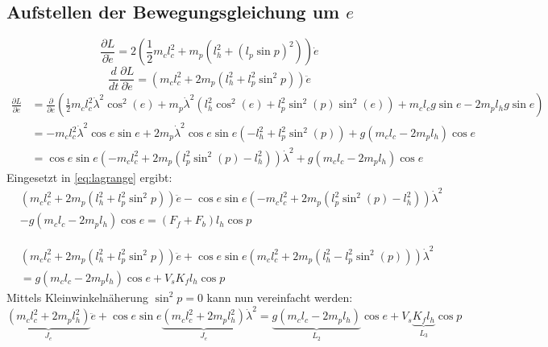 \documentclass{article}
\begin{document}
\subsection{Aufstellen der Bewegungsgleichung um $e$}
\begin{equation}
\frac{\partial L}{\partial \dot{e}} = 2(\frac{1}{2}m_cl_c^2
+ m_p(l_h^2+(l_p\sin p)^2))\dot{e}
\end{equation}
\begin{equation}
\frac{d}{dt}\frac{\partial L}{\partial \dot{e}} = (m_cl_c^2
+ 2 m_p(l_h^2+l_p^2\sin^2 p))\ddot{e}
\end{equation}
\begin{equation}
\begin{split}
\frac{\partial L}{\partial e} &= \frac{\partial}{\partial e}(\frac{1}{2} m_c l_c^2 \dot{\lambda}^2 \cos^2 (e) + m_p \dot{\lambda}^2 (l_h^2 \cos^2 (e) + l_p^2 \sin^2 (p) \sin^2 (e))
+ m_c l_c g \sin e - 2 m_p l_h g \sin e)\\
&= -m_c l_c^2 \dot{\lambda}^2 \cos e \sin e + 2 m_p \dot{\lambda}^2 \cos e \sin e (-l_h^2  + l_p^2 \sin^2 (p) ) + g(m_c l_c - 2 m_p l_h) \cos e\\
&= \cos e \sin e  (-m_c l_c^2 + 2 m_p (l_p^2 \sin^2 (p) -l_h^2  )) \dot{\lambda}^2+ g(m_c l_c - 2 m_p l_h) \cos e
\end{split}
\end{equation}
Eingesetzt in \eqref{eq:lagrange} ergibt:
\begin{equation}
\begin{split}
&(m_cl_c^2+ 2 m_p(l_h^2+l_p^2\sin^2 p))\ddot{e} - \cos e \sin e (-m_c l_c^2 + 2 m_p (l_p^2 \sin^2 (p) -l_h^2  ))\dot{\lambda}^2 \\
& - g(m_c l_c - 2 m_p l_h) \cos e = (F_f + F_b)l_h  \cos p
\end{split}
\end{equation}

\begin{equation}
\begin{split}
&(m_cl_c^2+ 2 m_p(l_h^2+l_p^2\sin^2 p))\ddot{e} + \cos e \sin e (m_c l_c^2 + 2 m_p ( l_h^2 -l_p^2 \sin^2 (p) )) \dot{\lambda}^2 \\
&= g(m_c l_c - 2 m_p l_h) \cos e + V_s K_f l_h  \cos p
\end{split}
\end{equation}
Mittels Kleinwinkelnäherung $\sin^2 p = 0$ kann nun vereinfacht werden:
\begin{equation}
\underbrace{(m_cl_c^2+ 2 m_p l_h^2)}_{J_e}\ddot{e} + \cos e \sin e \underbrace{(m_c l_c^2 + 2 m_p l_h^2 )}_{J_e} \dot{\lambda}^2 
= \underbrace{g(m_c l_c - 2 m_p l_h)}_{L_2} \cos e + V_s \underbrace{ K_f l_h}_{L_3}  \cos p
\end{equation}
\end{document}
